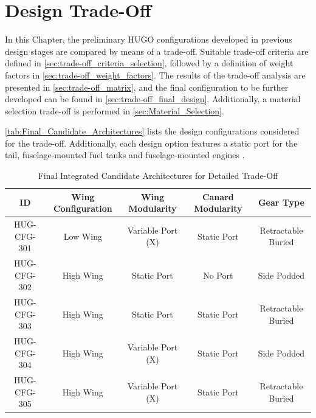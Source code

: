\chapter{Design Trade-Off}
\label{ch:trade-off}
In this Chapter, the preliminary HUGO configurations developed in previous design stages are compared by means of a trade-off. Suitable trade-off criteria are defined in \autoref{sec:trade-off_criteria_selection}, followed by a definition of weight factors in \autoref{sec:trade-off_weight_factors}. The results of the trade-off analysis are presented in \autoref{sec:trade-off_matrix}, and the final configuration to be further developed can be found in \autoref{sec:trade-off_final_design}. Additionally, a material selection trade-off is performed in \autoref{sec:Material_Selection}. 

\autoref{tab:Final_Candidate_Architectures} lists the design configurations considered for the trade-off. Additionally, each design option features a static port for the tail, fuselage-mounted fuel tanks and fuselage-mounted engines .

\begin{table}[H]
    \centering
    \caption{Final Integrated Candidate Architectures for Detailed Trade-Off }
    \label{tab:Final_Candidate_Architectures}
    \renewcommand{\arraystretch}{1.3}
    \begin{tabular}{|c|c|c|c|c|}
        \hline
        \textbf{ID} & \textbf{Wing Configuration} & \textbf{Wing Modularity} & \textbf{Canard Modularity} & \textbf{Gear Type}    \\
        \hline\hline
        HUG-CFG-301 & Low Wing & Variable Port (X) & Static Port & Retractable Buried \\
        \hline
        HUG-CFG-302 & High Wing & Static Port & No Port & Side Podded \\
        \hline
        HUG-CFG-303 & High Wing & Static Port & Static Port & Retractable Buried \\
        \hline
        HUG-CFG-304 & High Wing & Variable Port (X) & Static Port & Side Podded \\
        \hline
        HUG-CFG-305 & High Wing & Variable Port (X) & Static Port & Retractable Buried \\
        \hline
    \end{tabular}
\end{table}

